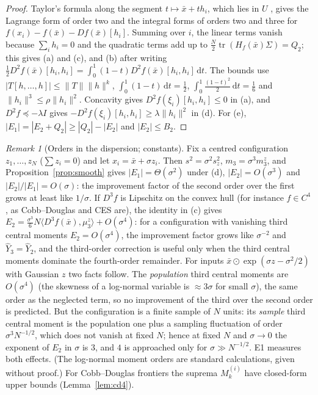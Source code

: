 \documentclass[10pt,a4paper]{article}
\theoremstyle{plain}
\theoremstyle{definition}
\theoremstyle{remark}
\newtheorem{remark}[theorem]{Remark}
\newcommand{\tr}{\operatorname{tr}}
\newcommand{\dd}{\mathrm{d}}
\newcommand{\Yh}{\widehat{Y}}
\newcommand{\Hf}{H_f}
\begin{document}
\begin{proof}
Taylor's formula along the segment $t\mapsto\bar x+th_i$, which lies in $U$ \citep[Ch.~VIII]{dieudonne1960}, gives the Lagrange form of order two and the integral forms of orders two and three for $f(x_i)-f(\bar x)-Df(\bar x)[h_i]$. Summing over $i$, the linear terms vanish because $\sum_ih_i=0$ and the quadratic terms add up to $\frac N2\tr(\Hf(\bar x)\Sigma)=Q_2$; this gives (a) and (c), and (b) after writing $\frac12D^2\!f(\bar x)[h_i,h_i]=\int_0^1(1-t)D^2\!f(\bar x)[h_i,h_i]\,\dd t$. The bounds use $|T[h,\dots,h]|\le\|T\|\|h\|^k$, $\int_0^1(1-t)\,\dd t=\frac12$, $\int_0^1\frac{(1-t)^2}{2}\,\dd t=\frac16$ and $\|h_i\|^3\le\rho\|h_i\|^2$. Concavity gives $D^2\!f(\xi_i)[h_i,h_i]\le0$ in (a), and $D^2\!f\preceq-\lambda I$ gives $-D^2\!f(\xi_i)[h_i,h_i]\ge\lambda\|h_i\|^2$ in (d). For (e), $|E_1|=|E_2+Q_2|\ge|Q_2|-|E_2|$ and $|E_2|\le B_2$.
\end{proof}

\begin{remark}[Orders in the dispersion; constants]\label{rem:orders}
Fix a centred configuration $z_1,\dots,z_N$ ($\sum z_i=0$) and let $x_i=\bar x+\sigma z_i$. Then $s^2=\sigma^2s_z^2$, $m_3=\sigma^3m_3^z$, and Proposition~\ref{prop:smooth} gives $|E_1|=\Theta(\sigma^2)$ under (d), $|E_2|=O(\sigma^3)$ and $|E_2|/|E_1|=O(\sigma)$: the improvement factor of the second order over the first grows at least like $1/\sigma$. If $D^3\!f$ is Lipschitz on the convex hull (for instance $f\in C^4$, as Cobb--Douglas and CES are), the identity in (c) gives $E_2=\frac{\sigma^3}{6}N\langle D^3\!f(\bar x),\mu_3^z\rangle+O(\sigma^4)$: for a configuration with vanishing third central moments $E_2=O(\sigma^4)$, the improvement factor grows like $\sigma^{-2}$ and $\Yh_3=\Yh_2$, and the third-order correction is useful only when the third central moments dominate the fourth-order remainder. For inputs $\bar x\odot\exp(\sigma z-\sigma^2/2)$ with Gaussian $z$ two facts follow. The \emph{population} third central moments are $O(\sigma^4)$ (the skewness of a log-normal variable is $\approx3\sigma$ for small $\sigma$), the same order as the neglected term, so no improvement of the third over the second order is predicted. But the configuration is a finite sample of $N$ units: its \emph{sample} third central moment is the population one plus a sampling fluctuation of order $\sigma^3N^{-1/2}$, which does not vanish at fixed $N$; hence at fixed $N$ and $\sigma\to0$ the exponent of $E_2$ in $\sigma$ is $3$, and $4$ is approached only for $\sigma\gg N^{-1/2}$. E1 measures both effects. (The log-normal moment orders are standard calculations, given without proof.) For Cobb--Douglas frontiers the suprema $M_k^{(i)}$ have closed-form upper bounds (Lemma~\ref{lem:cd4}).
\end{remark}
\end{document}
